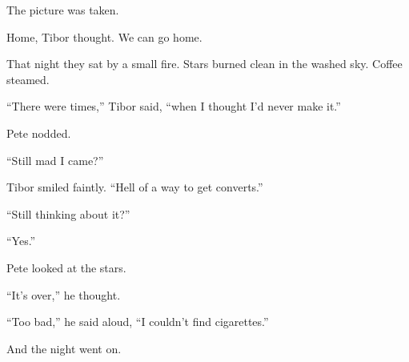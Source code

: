 The picture was taken.

Home, Tibor thought. We can go home.

That night they sat by a small fire. Stars burned clean in the washed sky. Coffee steamed.

“There were times,” Tibor said, “when I thought I’d never make it.”

Pete nodded.

“Still mad I came?”

Tibor smiled faintly. “Hell of a way to get converts.”

“Still thinking about it?”

“Yes.”

Pete looked at the stars.

“It’s over,” he thought.

“Too bad,” he said aloud, “I couldn’t find cigarettes.”

And the night went on.

